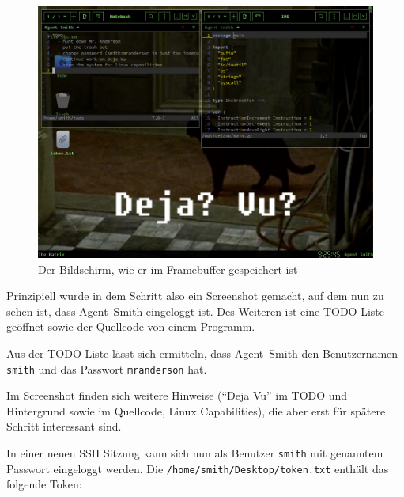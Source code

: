 \clearpage
\begin{landscape}
\begin{figure}[!ht]
\centering
\includegraphics[height=\textwidth]{video/fb0.png}
\caption{Der Bildschirm, wie er im Framebuffer gespeichert ist}
\end{figure}
\end{landscape}
\clearpage

Prinzipiell wurde in dem Schritt also ein Screenshot gemacht, auf dem nun zu sehen ist, dass Agent~Smith eingeloggt ist.
Des Weiteren ist eine TODO-Liste geöffnet sowie der Quellcode von einem Programm.

Aus der TODO-Liste lässt sich ermitteln, dass Agent~Smith den Benutzernamen \texttt{smith} und das Passwort \texttt{mranderson} hat.

Im Screenshot finden sich weitere Hinweise (\enquote{Deja Vu} im TODO und Hintergrund sowie im Quellcode, Linux Capabilities), die aber erst für spätere Schritt interessant sind.

In einer neuen SSH Sitzung kann sich nun als Benutzer \texttt{smith} mit genanntem Passwort eingeloggt werden.
Die \texttt{/home/smith/Desktop/token.txt} enthält das folgende Token:

